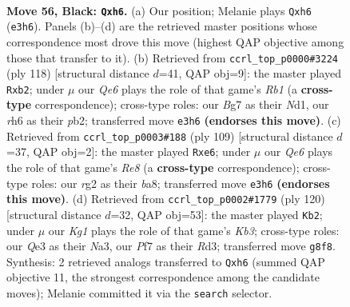 \documentclass[11pt]{article}
\begin{document}
\clearpage

\begin{figure}[p]\centering
\begin{subfigure}{0.46\textwidth}\centering
\resizebox{\linewidth}{!}{%
\newchessgame
\chessboard[
  setfen={6k1/2n2pb1/7R/3P4/8/4q3/6R1/5K2 b - - 2 56},
  showmover=false,
  pgfstyle=straightmove, color=movearrow, markmove={e3-h6}
]}
\caption{}
\end{subfigure}\hfill
\begin{subfigure}{0.46\textwidth}\centering
\resizebox{\linewidth}{!}{%
\newchessgame
\chessboard[
  setfen={8/8/6p1/6k1/8/3r4/1p4KP/1R1N4 w - - 7 60},
  showmover=false,
  pgfstyle=straightmove, color=movearrow, markmove={b1-b2}
]}
\caption{}
\end{subfigure}
\\[4pt]
\begin{subfigure}{0.46\textwidth}\centering
\resizebox{\linewidth}{!}{%
\newchessgame
\chessboard[
  setfen={B7/2pk4/4R3/3P2b1/8/8/1K6/4r3 b - - 18 55},
  showmover=false,
  pgfstyle=straightmove, color=movearrow, markmove={e1-e6}
]}
\caption{}
\end{subfigure}\hfill
\begin{subfigure}{0.46\textwidth}\centering
\resizebox{\linewidth}{!}{%
\newchessgame
\chessboard[
  setfen={8/7k/8/1p6/1P6/NK1RB1r1/8/2r5 w - - 23 61},
  showmover=false,
  pgfstyle=straightmove, color=movearrow, markmove={b3-b2}
]}
\caption{}
\end{subfigure}
\caption{\textbf{Move 56, Black: \texttt{Qxh6}.} (a) Our position; Melanie plays \texttt{Qxh6} (\texttt{e3h6}). Panels (b)--(d) are the retrieved master positions whose correspondence most drove this move (highest QAP objective among those that transfer to it). (b) Retrieved from \texttt{ccrl\_top\_p0000\#3224} (ply 118) [structural distance $d$=41, QAP obj=9]: the master played \texttt{Rxb2}; under $\mu$ our \emph{Qe6} plays the role of that game's \emph{Rb1} (a \textbf{cross-type} correspondence); cross-type roles: our \emph{B}g7 as their \emph{N}d1, our \emph{r}h6 as their \emph{p}b2; transferred move \texttt{e3h6} \textbf{(endorses this move)}. (c) Retrieved from \texttt{ccrl\_top\_p0003\#188} (ply 109) [structural distance $d$=37, QAP obj=2]: the master played \texttt{Rxe6}; under $\mu$ our \emph{Qe6} plays the role of that game's \emph{Re8} (a \textbf{cross-type} correspondence); cross-type roles: our \emph{r}g2 as their \emph{b}a8; transferred move \texttt{e3h6} \textbf{(endorses this move)}. (d) Retrieved from \texttt{ccrl\_top\_p0002\#1779} (ply 120) [structural distance $d$=32, QAP obj=53]: the master played \texttt{Kb2}; under $\mu$ our \emph{Kg1} plays the role of that game's \emph{Kb3}; cross-type roles: our \emph{Q}e3 as their \emph{N}a3, our \emph{P}f7 as their \emph{R}d3; transferred move \texttt{g8f8}. Synthesis: 2 retrieved analogs transferred to \texttt{Qxh6} (summed QAP objective 11, the strongest correspondence among the candidate moves); Melanie committed it via the \texttt{search} selector.}
\label{fig:thought-m111}
\end{figure}
\end{document}
